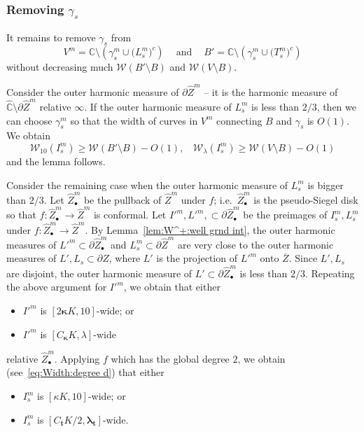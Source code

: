 \documentclass{amsart}
\renewcommand{\sp}{{\ \ }}
\newcommand{\1}{{\mathbb 1 }}
\newcommand{\blambda}{{\boldsymbol\lambda}}
\newcommand{\bkappa}{{\boldsymbol\kappa}}
\newcommand{\Width}{{\mathcal W}}
\newcommand{\wZ}{{\widehat Z}}
\newcommand{\bbt}{{\mathbf t}}
\newcommand{\wC}{\widehat{\mathbb{C}}}
\newcommand{\C}{\mathbb{C}}
\theoremstyle{remark}
\numberwithin{equation}{section}
\theoremstyle{definition}
\begin{document}
 
\subsubsection{Removing $\gamma_s$}
\label{sss:removing gamma} It remains to remove $\gamma_s$ from 
\[V^m=  \C\setminus \left(\gamma^m_s\cup \big(L^m_s\big)^c\right) \sp\sp \text{ and }\sp\sp B'=  \C\setminus \left(\gamma^m_s\cup \big(T^m_s\big)^c\right)\]
without decreasing much $\Width(B'\setminus B)$ and $\Width(V\setminus  B)$.

Consider the outer harmonic measure of $\partial \wZ^m$ -- it is the harmonic measure of $\wC\setminus \partial \wZ^m$ relative $\infty$. If the outer harmonic measure of $L^m_s$ is less than $2/3$, then we can choose $\gamma^m_s$ so that the width of curves in $V^m$ connecting $B$ and $\gamma_s$ is $O(1)$. We obtain
\[ \Width_{10} (I^m_s)\ge \Width(B'\setminus  B)- O(1),\sp\sp \Width_{\lambda} (I^m_s)\ge \Width(V\setminus  B)- O(1)\]
and the lemma follows.

Consider the remaining case when the outer harmonic measure of $L^m_s$ is bigger than $2/3$. Let $\wZ^m_\bullet$ be the pullback of $\wZ^m$ under $f$; i.e.~$\wZ^m_\bullet$ is the pseudo-Siegel disk so that $f\colon \wZ^m_\bullet\to \wZ^m$ is conformal. Let $I'^m, L'^m,\subset \partial \wZ^m_\bullet$ be the preimages of $I^m_s,L^m_s$ under $f\colon \wZ^m_\bullet\to \wZ^m$. By Lemma~\ref{lem:W^+:well grnd int}, the outer harmonic measures of $L'^m\subset \partial \wZ^m_\bullet$ and $L^m_s\subset \partial \wZ^m$ are very close to the outer harmonic measures of $L',L_s\subset \partial Z$, where $L'$ is the projection of $L'^m$ onto $\overline Z$. Since $L',L_s$ are disjoint, the outer harmonic measure of $L'\subset \partial \wZ^m_\bullet$ is less than $2/3$. Repeating the above argument for $I'^m$, we obtain that 
either 
\begin{itemize}
\item $I'^m$ is $[2\bkappa K,10]$-wide;  or
\item $I'^m$ is $[ C_{\bkappa} K,\lambda]$-wide
\end{itemize}   
relative $\wZ^m_\bullet$. Applying $f$ which has the global degree $2$, we obtain (see~\eqref{eq:Width:degree d}) that either
\begin{itemize}
\item $I^m_s$ is $[\kappa K,10]$-wide;  or
\item $I^m_s$ is $[ C_{\bbt} K/2,\blambda_\bbt]$-wide.
\end{itemize}   
\end{document}

